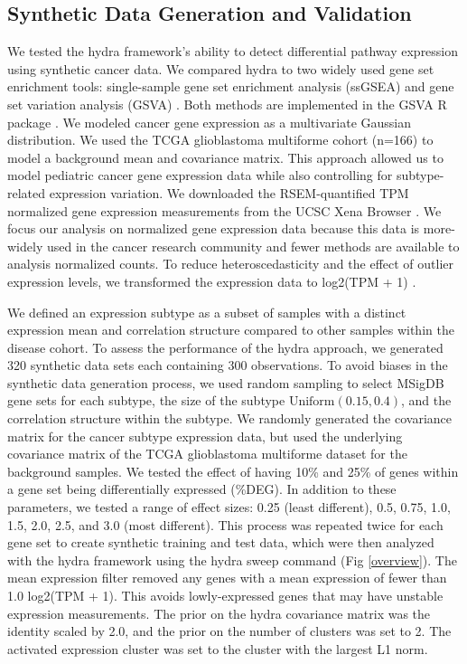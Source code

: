 \documentclass[10pt,letterpaper]{article}
\begin{document}
\subsection*{Synthetic Data Generation and Validation}
We tested the hydra framework's ability to detect differential pathway expression using synthetic cancer data. We compared hydra to two widely used gene set enrichment tools: single-sample gene set enrichment analysis (ssGSEA) and gene set variation analysis (GSVA) \cite{barbieSystematicRNAInterference2009, hanzelmannGSVAGeneSet2013, tarcaComparisonGeneSet2013}. Both methods are implemented in the GSVA R package \cite{hanzelmannGSVAGeneSet2013}. We modeled cancer gene expression as a multivariate Gaussian distribution. We used the TCGA glioblastoma multiforme cohort (n=166) to model a background mean and covariance matrix. This approach allowed us to model pediatric cancer gene expression data while also controlling for subtype-related expression variation. We downloaded the RSEM-quantified TPM normalized gene expression measurements from the UCSC Xena Browser \cite{goldmanUCSCXenaPlatform2018}. We focus our analysis on normalized gene expression data because this data is more-widely used in the cancer research community and fewer methods are available to analysis normalized counts. To reduce heteroscedasticity and the effect of outlier expression levels, we transformed the expression data to log2(TPM + 1) \cite{zwienerTransformingRNASeqData2014}.
 
We defined an expression subtype as a subset of samples with a distinct expression mean and correlation structure compared to other samples within the disease cohort. To assess the performance of the hydra approach, we generated 320 synthetic data sets each containing 300 observations. To avoid biases in the synthetic data generation process, we used random sampling to select MSigDB gene sets for each subtype, the size of the subtype $\text{Uniform}(0.15, 0.4)$, and the correlation structure within the subtype. We randomly generated the covariance matrix for the cancer subtype expression data, but used the underlying covariance matrix of the TCGA glioblastoma multiforme dataset for the background samples. We tested the effect of having 10\% and 25\% of genes within a gene set being differentially expressed (\%DEG). In addition to these parameters, we tested a range of effect sizes: 0.25 (least different), 0.5, 0.75, 1.0, 1.5, 2.0, 2.5, and 3.0 (most different). This process was repeated twice for each gene set to create synthetic training and test data, which were then analyzed with the hydra framework using the hydra sweep command (Fig \ref{overview}). The mean expression filter removed any genes with a mean expression of fewer than 1.0 log2(TPM + 1). This avoids lowly-expressed genes that may have unstable expression measurements. The prior on the hydra covariance matrix was the identity scaled by 2.0, and the prior on the number of clusters was set to 2. The activated expression cluster was set to the cluster with the largest L1 norm.
\end{document}
